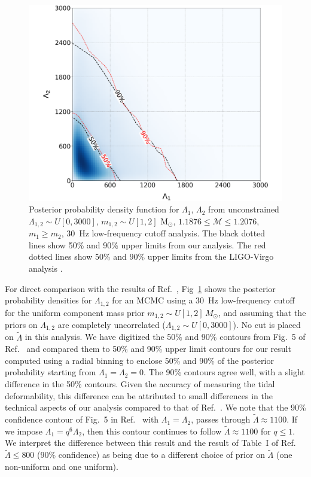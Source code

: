 \begin{figure}[b]
\includegraphics[width=\textwidth]{figures/common_eos/lambda1_2_3x_ul.pdf}
\caption{Posterior probability density function for $\Lambda_1$, $\Lambda_2$ from unconstrained $\Lambda_{1,2} \sim U[0, 3000]$, $m_{1,2} \sim U[1, 2]$ M$_\odot$, $1.1876 \leq \mathcal{M} \leq 1.2076$, $m_1 \geq m_2$, 30~Hz low-frequency cutoff analysis. The black dotted lines show 50\% and 90\% upper limits from our analysis. The red dotted lines show 50\% and 90\% upper limits from the LIGO-Virgo analysis \cite{TheLIGOScientific:2017qsa}. } 
\label{fig:lv_compare}
\end{figure}

For direct comparison with the results of Ref.~\cite{TheLIGOScientific:2017qsa}, Fig~\ref{fig:lv_compare} shows the posterior probability densities for $\Lambda_{1,2}$ for an MCMC using a $30$~Hz low-frequency cutoff for the uniform component mass prior $m_{1,2} \sim U[1,2]\, M_\odot$, and assuming that the priors on $\Lambda_{1,2}$ are completely uncorrelated ($\Lambda_{1,2} \sim U[0,3000]$). No cut is placed on $\tilde\Lambda$ in this analysis. We have digitized the 50\% and 90\% contours from Fig.~5 of Ref.~\cite{TheLIGOScientific:2017qsa} and compared them to 50\% and 90\% upper limit contours for our result computed using a radial binning to enclose 50\% and 90\% of the posterior probability starting from $\Lambda_1 = \Lambda_2 = 0$. The 90\% contours agree well, with a slight difference in the 50\% contours. Given the accuracy of measuring the tidal deformability, this difference can 
be attributed to small differences in the technical aspects of our analysis compared to that of Ref.~\cite{TheLIGOScientific:2017qsa}. We note that the 90\% confidence contour of Fig.~5 in Ref.~\cite{TheLIGOScientific:2017qsa} with $\Lambda_1=\Lambda_2$, passes through $\tilde\Lambda \approx 1100$. If we impose $\Lambda_1=q^6 \Lambda_2$, then this contour continues to follow $\tilde\Lambda \approx 1100$ for $q \leq 1$. We interpret the difference between this result and the result of Table~I of Ref.~\cite{TheLIGOScientific:2017qsa} $\tilde\Lambda \le 800$ (90\% confidence) as being due to a different choice of prior on $\tilde\Lambda$ (one non-uniform and one uniform).

